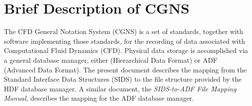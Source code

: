 \section{Brief Description of CGNS}
\label{s:brief}
\thispagestyle{plain}

The CFD General Notation System (CGNS) is a set of standards, together
with software implementing those standards, for the recording of data
associated with Computational Fluid Dynamics (CFD).
Physical data storage is accomplished via a general database manager,
either \HDF (Hierarchical Data Format) or ADF (Advanced Data Format).
The present document describes the mapping from the Standard Interface
Data Structures (SIDS) to the file structure provided by the HDF
database manager.
A similar document, the \textit{SIDS-to-ADF File Mapping Manual},
describes the mapping for the ADF database manager.
